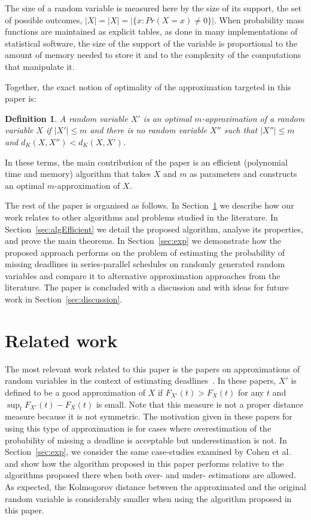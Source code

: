 \documentclass[letterpaper]{article} %
\newtheorem{definition}[thm]{Definition}
\begin{document}
The size of a random variable is measured here by the size of its support, the set of possible outcomes, $|X|=|X|=|\{x\colon Pr(X=x) \neq 0\}|$. When probability mass functions are maintained as explicit tables, as done in many implementations of statistical software, the size of the support of the variable is proportional to the amount of memory needed to store it and to the complexity of the computations that manipulate it. 

Together, the exact notion of optimality of the approximation targeted in this paper is:
\begin{definition}
	A random variable $X'$ is an optimal $m$-approximation of a random variable $X$ if $|X'| \leq m$ and there is no random variable $X''$ such that $|X''| \leq m$ and $d_K(X,X'') < d_K(X,X')$.
\end{definition}

In these terms, the main contribution of the paper is an efficient (polynomial time and memory) algorithm that takes $X$ and $m$ as parameters and constructs an optimal $m$-approximation of $X$.

The rest of the paper is organised as follows. In Section~\ref{sec:relwork} we describe how our work relates to other algorithms and problems studied in the literature. In Section~\ref{sec:algEfficient} we detail the proposed algorithm, analyse its properties, and prove the main theorems. In Section~\ref{sec:exp} we demonstrate how the proposed approach performs on the problem of estimating the probability of missing deadlines in series-parallel schedules on randomly generated random variables and compare it to alternative approximation approaches from the literature. The paper is concluded with a discussion and with ideas for future work in Section~\ref{sec:discussion}.

\section{Related work}\label{sec:relwork}
The most relevant work related to this paper is the papers on approximations of random variables in the context of estimating deadlines~\cite{cohen2015estimating,CohenGW18}. In these papers, $X'$ is defined to be a good approximation of $X$ if $F_{X'}(t) > F_{X}(t)$ for any $t$ and $\sup_t F_{X'}(t) - F_{X}(t)$ is small. Note that this measure is not a proper distance measure because it is not symmetric. The motivation given in these papers for using this type of approximation is for cases where overestimation of the probability of missing a deadline is acceptable but underestimation is not. In Section~\ref{sec:exp}, we consider the same case-studies examined by Cohen et al. and show how the algorithm proposed in this paper performs relative to the algorithms proposed there when both over- and under- estimations are allowed. As expected, the Kolmogorov distance between the approximated and the original random variable is considerably smaller when using the algorithm proposed in this paper. 
\end{document}
